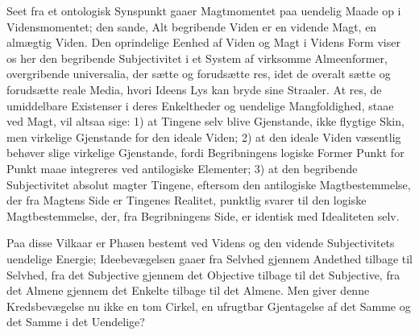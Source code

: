 \documentclass[12pt]{book}
\newcommand{\opage}[1]{\marginnote{\footnotesize\textit{[#1]}}}
\begin{document}
Seet fra et ontologisk Synspunkt gaaer Magtmomentet paa uendelig Maade op i Vidensmomentet; den
sande, Alt begribende Viden er en vidende Magt, en almægtig Viden. Den oprindelige Eenhed af Viden
og Magt i Videns Form viser os her den begribende Subjectivitet i et System af virksomme
Almeenformer, overgribende universalia, der sætte og forudsætte res, idet de overalt sætte og
forudsætte reale Media, hvori Ideens Lys kan bryde sine Straaler.
\opage{191} At res, de umiddelbare Existenser i deres Enkeltheder og uendelige Mangfoldighed, staae ved Magt,
vil altsaa sige: 1) at Tingene selv blive Gjenstande, ikke flygtige Skin, men virkelige
Gjenstande for den ideale Viden; 2) at den ideale Viden væsentlig behøver slige virkelige
Gjenstande, fordi Begribningens logiske Former Punkt for Punkt maae integreres ved antilogiske
Elementer; 3) at den begribende Subjectivitet absolut magter Tingene, eftersom den antilogiske
Magtbestemmelse, der fra Magtens Side er Tingenes Realitet, punktlig svarer til den logiske
Magtbestemmelse, der, fra Begribningens Side, er identisk med Idealiteten selv.

Paa disse Vilkaar er Phasen bestemt ved Videns og den vidende Subjectivitets uendelige Energie;
Ideebevægelsen gaaer fra Selvhed gjennem Andethed tilbage til Selvhed, fra det Subjective gjennem
det Objective tilbage til det Subjective, fra det Almene gjennem det Enkelte tilbage til det
Almene. Men giver denne Kredsbevægelse nu ikke en tom Cirkel, en ufrugtbar Gjentagelse af det
Samme og det Samme i det Uendelige?
\end{document}
